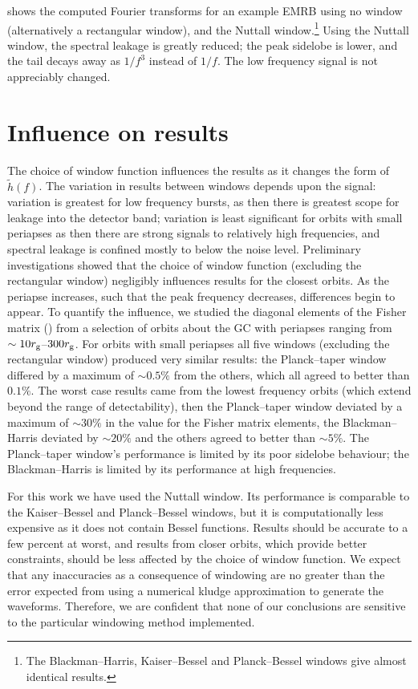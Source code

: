  shows the computed Fourier transforms for an example EMRB using no window (alternatively a rectangular window), and the Nuttall window.\footnote{The Blackman--Harris, Kaiser--Bessel and Planck--Bessel windows give almost identical results.} Using the Nuttall window, the spectral leakage is greatly reduced; the peak sidelobe is lower, and the tail decays away as $1/{f^3}$ instead of $1/{f}$. The low frequency signal is not appreciably changed.

\section{Influence on results}

The choice of window function influences the results as it changes the form of $\widetilde{h}(f)$. The variation in results between windows depends upon the signal: variation is greatest for low frequency bursts, as then there is greatest scope for leakage into the detector band; variation is least significant for orbits with small periapses as then there are strong signals to relatively high frequencies, and spectral leakage is confined mostly to below the noise level. Preliminary investigations showed that the choice of window function (excluding the rectangular window) negligibly influences results for the closest orbits. As the periapse increases, such that the peak frequency decreases, differences begin to appear. To quantify the influence, we studied the diagonal elements of the Fisher matrix () from a selection of orbits about the GC with periapses ranging from $\sim 10 r_\mathrm{g}$--$300 r_\mathrm{g}$. For orbits with small periapses all five windows (excluding the rectangular window) produced very similar results: the Planck--taper window differed by a maximum of $\sim 0.5\%$ from the others, which all agreed to better than $0.1\%$. The worst case results came from the lowest frequency orbits (which extend beyond the range of detectability), then the Planck--taper window deviated by a maximum of $\sim 30\%$ in the value for the Fisher matrix elements, the Blackman--Harris deviated by $\sim 20\%$ and the others agreed to better than $\sim 5\%$. The Planck--taper window's performance is limited by its poor sidelobe behaviour; the Blackman--Harris is limited by its performance at high frequencies.

For this work we have used the Nuttall window. Its performance is comparable to the Kaiser--Bessel and Planck--Bessel windows, but it is computationally less expensive as it does not contain Bessel functions. Results should be accurate to a few percent at worst, and results from closer orbits, which provide better constraints, should be less affected by the choice of window function. We expect that any inaccuracies as a consequence of windowing are no greater than the error expected from using a numerical kludge approximation to generate the waveforms. Therefore, we are confident that none of our conclusions are sensitive to the particular windowing method implemented.